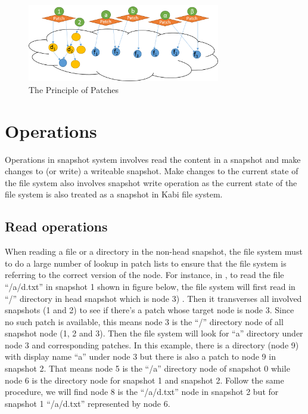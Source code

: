 \begin{figure}[hbtp]
\centering
\includegraphics[width=0.75\textwidth]{Chapter-4/figs/fig14.png}
\caption{The Principle of Patches}
\label{fig:patches}
\end{figure}

\section{Operations}

    Operations in snapshot system involves read the content in a snapshot and make changes to (or write) a writeable snapshot. Make changes to the current state of the file system also involves snapshot write operation as the current state of the file system is also treated as a snapshot in Kabi file system.

\subsection{Read operations}

    When reading a file or a directory in the non-head snapshot, the file system must to do a large number of lookup in patch lists to ensure that the file system is referring to the correct version of the node. For instance, in  , to read the file ``/a/d.txt'' in snapshot 1 shown in figure below, the file system will first read in ``/'' directory in head snapshot which is node 3) . Then it transverses all involved snapshots (1 and 2) to see if there's a patch whose target node is node 3. Since no such patch is available, this means node 3 is the ``/'' directory node of all snapshot node (1, 2 and 3). Then the file system will look for “a” directory under node 3 and corresponding patches. In this example, there is a directory (node 9) with display name “a” under node 3 but there is also a patch to node 9 in snapshot 2. That means node 5 is the ``/a'' directory node of snapshot 0 while node 6 is the directory node for snapshot 1 and snapshot 2. Follow the same procedure, we will find node 8 is the ``/a/d.txt'' node in snapshot 2 but for snapshot 1 ``/a/d.txt'' represented by node 6.

